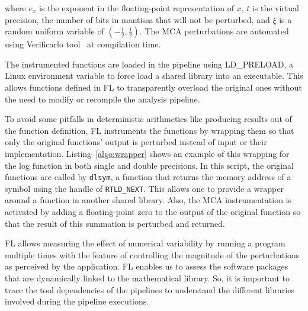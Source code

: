 \documentclass[conference]{IEEEtran}
\begin{document}
where $e_x$ is the exponent in the floating-point representation of $x$,
$t$ is the virtual precision, the number of bits in mantissa that will not be perturbed,
and $\xi$ is a random uniform variable of $(-\frac{1}{2}, \frac{1}{2})$.
The MCA perturbations are automated using Verificarlo tool~\cite{denis2015verificarlo} at compilation time.

The instrumented functions are loaded in the pipeline using LD\_PRELOAD, a Linux environment variable
to force load a shared library into an executable. This allows functions defined in FL to transparently
overload the original ones without the need to modify or recompile the analysis pipeline.

To avoid some pitfalls in deterministic arithmetics like producing results out of the function definition,
FL instruments the functions by wrapping them so that only the original functions' output
is perturbed instead of input or their implementation.
Listing~\ref{algo:wrapper} shows an example of this wrapping for the log function in both single and double precisions.
In this script, the original functions are called by \texttt{dlsym},
a function that returns the memory address of a symbol using the handle of \texttt{RTLD\_NEXT}.
This allows one to provide a wrapper around a function in another shared library.
Also, the MCA instrumentation is activated by adding a floating-point zero to the output of the original function
so that the result of this summation is perturbed and returned.




%

FL allows measuring the effect of numerical variability by running a program multiple times
with the feature of controlling the magnitude of the perturbations as perceived by the application.
FL enables us to assess the software packages that are dynamically linked to the mathematical library.
So, it is important to trace the tool dependencies of the pipelines to understand the different libraries
involved during the pipeline executions.
\end{document}
